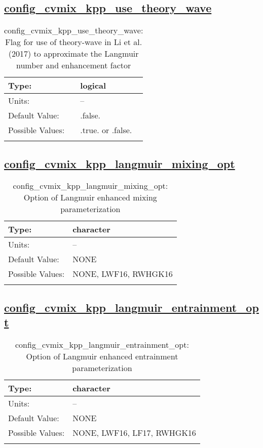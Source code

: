 \subsection[config\_cvmix\_kpp\_use\_theory\_wave]{\hyperref[sec:nm_tab_cvmix]{config\_cvmix\_kpp\_use\_theory\_wave}}
\label{subsec:nm_sec_config_cvmix_kpp_use_theory_wave}
\begin{center}
\begin{longtable}{| p{2.0in} || p{4.0in} |}
    \hline
    Type: & logical \\
    \hline
    Units: & -- \\
    \hline
    Default Value: & .false. \\
    \hline
    Possible Values: & .true. or .false. \\
    \hline
    \caption{config\_cvmix\_kpp\_use\_theory\_wave: Flag for use of theory-wave in Li et al. (2017) to approximate the Langmuir number and enhancement factor}
\end{longtable}
\end{center}
\subsection[config\_cvmix\_kpp\_langmuir\_mixing\_opt]{\hyperref[sec:nm_tab_cvmix]{config\_cvmix\_kpp\_langmuir\_mixing\_opt}}
\label{subsec:nm_sec_config_cvmix_kpp_langmuir_mixing_opt}
\begin{center}
\begin{longtable}{| p{2.0in} || p{4.0in} |}
    \hline
    Type: & character \\
    \hline
    Units: & -- \\
    \hline
    Default Value: & NONE \\
    \hline
    Possible Values: & NONE, LWF16, RWHGK16 \\
    \hline
    \caption{config\_cvmix\_kpp\_langmuir\_mixing\_opt: Option of Langmuir enhanced mixing parameterization}
\end{longtable}
\end{center}
\subsection[config\_cvmix\_kpp\_langmuir\_entrainment\_opt]{\hyperref[sec:nm_tab_cvmix]{config\_cvmix\_kpp\_langmuir\_entrainment\_opt}}
\label{subsec:nm_sec_config_cvmix_kpp_langmuir_entrainment_opt}
\begin{center}
\begin{longtable}{| p{2.0in} || p{4.0in} |}
    \hline
    Type: & character \\
    \hline
    Units: & -- \\
    \hline
    Default Value: & NONE \\
    \hline
    Possible Values: & NONE, LWF16, LF17, RWHGK16 \\
    \hline
    \caption{config\_cvmix\_kpp\_langmuir\_entrainment\_opt: Option of Langmuir enhanced entrainment parameterization}
\end{longtable}
\end{center}
